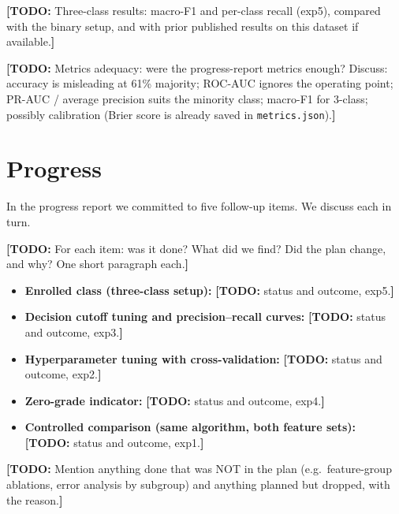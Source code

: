 \documentclass[11pt]{article}
\newcommand{\todo}[1]{{\color{red}\textbf{[TODO:} #1\textbf{]}}}
\newcommand{\todo}[1]{}
\begin{document}
\todo{Three-class results: macro-F1 and per-class recall (exp5), compared with the binary setup, and with prior published results on this dataset if available.}

\todo{Metrics adequacy: were the progress-report metrics enough? Discuss: accuracy is misleading at 61\% majority; ROC-AUC ignores the operating point; PR-AUC / average precision suits the minority class; macro-F1 for 3-class; possibly calibration (Brier score is already saved in \texttt{metrics.json}).}

\section{Progress}\label{sec:progress}

In the progress report we committed to five follow-up items. We discuss each in turn.

\todo{For each item: was it done? What did we find? Did the plan change, and why? One short paragraph each.}

\begin{itemize}
  \item \textbf{Enrolled class (three-class setup):} \todo{status and outcome, exp5.}
  \item \textbf{Decision cutoff tuning and precision--recall curves:} \todo{status and outcome, exp3.}
  \item \textbf{Hyperparameter tuning with cross-validation:} \todo{status and outcome, exp2.}
  \item \textbf{Zero-grade indicator:} \todo{status and outcome, exp4.}
  \item \textbf{Controlled comparison (same algorithm, both feature sets):} \todo{status and outcome, exp1.}
\end{itemize}

\todo{Mention anything done that was NOT in the plan (e.g.\ feature-group ablations, error analysis by subgroup) and anything planned but dropped, with the reason.}

\end{document}
